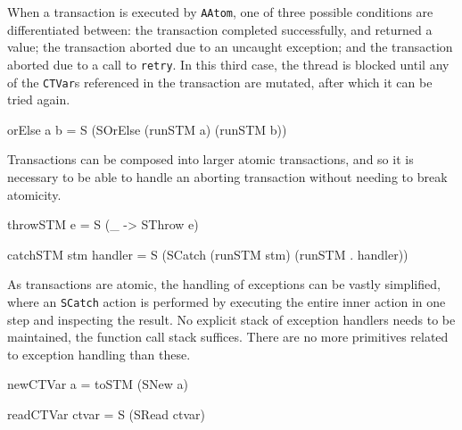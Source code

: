 
When a transaction is executed by \verb|AAtom|, one of three possible
conditions are differentiated between: the transaction completed
successfully, and returned a value; the transaction aborted due to an
uncaught exception; and the transaction aborted due to a call to
\verb|retry|. In this third case, the thread is blocked until any of
the \verb|CTVar|s referenced in the transaction are mutated, after
which it can be tried again.

\begin{haskellcode}
orElse a b = S (SOrElse (runSTM a) (runSTM b))
\end{haskellcode}


Transactions can be composed into larger atomic transactions, and so
it is necessary to be able to handle an aborting transaction without
needing to break atomicity.

\begin{haskellcode}
throwSTM e = S (\_ -> SThrow e)

catchSTM stm handler = S (SCatch (runSTM stm) (runSTM . handler))
\end{haskellcode}



As transactions are atomic, the handling of exceptions can be vastly
simplified, where an \verb|SCatch| action is performed by executing
the entire inner action in one step and inspecting the result. No
explicit stack of exception handlers needs to be maintained, the
function call stack suffices. There are no more primitives related to
exception handling than these.

\begin{haskellcode}
newCTVar a = toSTM (SNew a)
\end{haskellcode}


\begin{haskellcode}
readCTVar ctvar = S (SRead ctvar)
\end{haskellcode}

